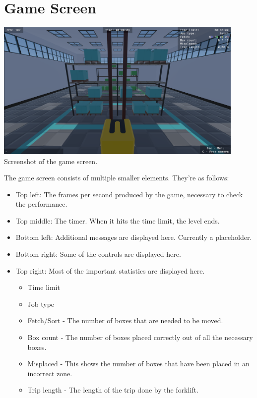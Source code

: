 \documentclass{article}
\begin{document}
\pagebreak

\section{Game Screen}
\begin{center}
    \includegraphics[width=12.1cm]{game_screen}\linebreak
    \small Screenshot of the game screen.
\end{center}

\normalsize
The game screen consists of multiple smaller elements. They're as follows:
\begin{itemize}
    \item Top left: The frames per second produced by the game, necessary to check the performance.
    \item Top middle: The timer. When it hits the time limit, the level ends.
    \item Bottom left: Additional messages are displayed here. Currently a placeholder. 
    \item Bottom right: Some of the controls are displayed here.
    \item Top right: Most of the important statistics are displayed here.
    \begin{itemize}
        \item Time limit
        \item Job type
        \item Fetch/Sort - The number of boxes that are needed to be moved.
        \item Box count - The number of boxes placed correctly out of all the necessary boxes.
        \item Misplaced - This shows the number of boxes that have been placed in an incorrect zone.
        \item Trip length - The length of the trip done by the forklift.
    \end{itemize}
\end{itemize}
\end{document}
